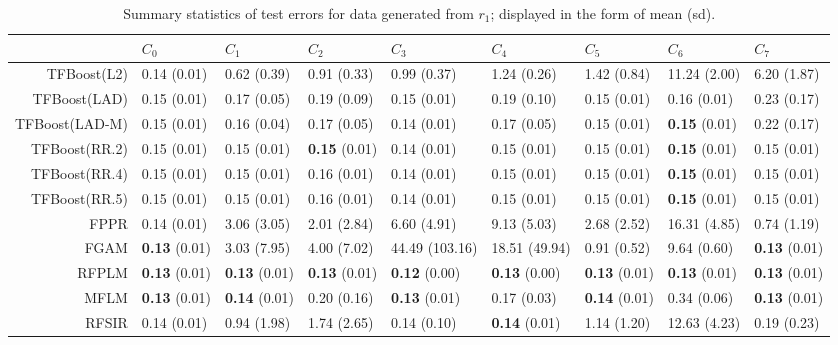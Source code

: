 \begin{table}[H]
\centering
\begin{tabular}{rllllllll}
  \hline
 & $C_0$ & $C_1$ & $C_2$ & $C_3$ & $C_4$ & $C_5$ & $C_6$ & $C_7$ \\ 
  \hline
TFBoost(L2) & 0.14 (0.01) & 0.62 (0.39) & 0.91 (0.33) & 0.99 (0.37) & 1.24 (0.26) & 1.42 (0.84) & 11.24 (2.00) & 6.20 (1.87) \\ 
  TFBoost(LAD) & 0.15 (0.01) & 0.17 (0.05) & 0.19 (0.09) & 0.15 (0.01) & 0.19 (0.10) & 0.15 (0.01) & 0.16 (0.01) & 0.23 (0.17) \\ 
  TFBoost(LAD-M) & 0.15 (0.01) & 0.16 (0.04) & 0.17 (0.05) & 0.14 (0.01) & 0.17 (0.05) & 0.15 (0.01) & \textbf{0.15} (0.01) & 0.22 (0.17) \\ 
  TFBoost(RR.2) & 0.15 (0.01) & 0.15 (0.01) & \textbf{0.15} (0.01) & 0.14 (0.01) & 0.15 (0.01) & 0.15 (0.01) & \textbf{0.15} (0.01) & 0.15 (0.01) \\ 
  TFBoost(RR.4) & 0.15 (0.01) & 0.15 (0.01) & 0.16 (0.01) & 0.14 (0.01) & 0.15 (0.01) & 0.15 (0.01) & \textbf{0.15} (0.01) & 0.15 (0.01) \\ 
  TFBoost(RR.5) & 0.15 (0.01) & 0.15 (0.01) & 0.16 (0.01) & 0.14 (0.01) & 0.15 (0.01) & 0.15 (0.01) & \textbf{0.15} (0.01) & 0.15 (0.01) \\ 
  FPPR & 0.14 (0.01) & 3.06 (3.05) & 2.01 (2.84) & 6.60 (4.91) & 9.13 (5.03) & 2.68 (2.52) & 16.31 (4.85) & 0.74 (1.19) \\ 
  FGAM & \textbf{0.13} (0.01) & 3.03 (7.95) & 4.00 (7.02) & 44.49 (103.16) & 18.51 (49.94) & 0.91 (0.52) & 9.64 (0.60) & \textbf{0.13} (0.01) \\ 
  RFPLM & \textbf{0.13} (0.01) & \textbf{0.13} (0.01) & \textbf{0.13} (0.01) & \textbf{0.12} (0.00) & \textbf{0.13} (0.00) & \textbf{0.13} (0.01) & \textbf{0.13} (0.01) & \textbf{0.13} (0.01) \\ 
  MFLM & \textbf{0.13} (0.01) & \textbf{0.14} (0.01) & 0.20 (0.16) & \textbf{0.13} (0.01) & 0.17 (0.03) & \textbf{0.14} (0.01) & 0.34 (0.06) & \textbf{0.13} (0.01) \\ 
  RFSIR & 0.14 (0.01) & 0.94 (1.98) & 1.74 (2.65) & 0.14 (0.10) & \textbf{0.14} (0.01) & 1.14 (1.20) & 12.63 (4.23) & 0.19 (0.23) \\ 
   \hline
\end{tabular}
\caption{Summary statistics of test errors for data generated from $r_1$; displayed in the form of mean (sd).} 
\end{table}

